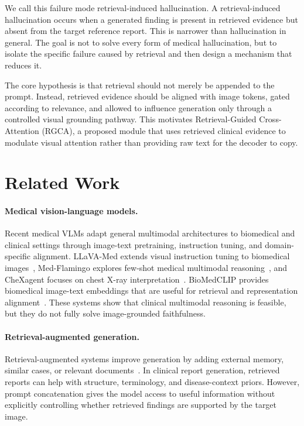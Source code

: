 \documentclass[11pt]{article}
\begin{document}
We call this failure mode retrieval-induced hallucination. A retrieval-induced hallucination occurs when a generated finding is present in retrieved evidence but absent from the target reference report. This is narrower than hallucination in general. The goal is not to solve every form of medical hallucination, but to isolate the specific failure caused by retrieval and then design a mechanism that reduces it.

The core hypothesis is that retrieval should not merely be appended to the prompt. Instead, retrieved evidence should be aligned with image tokens, gated according to relevance, and allowed to influence generation only through a controlled visual grounding pathway. This motivates Retrieval-Guided Cross-Attention (RGCA), a proposed module that uses retrieved clinical evidence to modulate visual attention rather than providing raw text for the decoder to copy.

\section{Related Work}

\paragraph{Medical vision-language models.}
Recent medical VLMs adapt general multimodal architectures to biomedical and clinical settings through image-text pretraining, instruction tuning, and domain-specific alignment. LLaVA-Med extends visual instruction tuning to biomedical images~\cite{li2023llavamed}, Med-Flamingo explores few-shot medical multimodal reasoning~\cite{moor2023medflamingo}, and CheXagent focuses on chest X-ray interpretation~\cite{chen2024chexagent}. BioMedCLIP provides biomedical image-text embeddings that are useful for retrieval and representation alignment~\cite{zhang2023biomedclip}. These systems show that clinical multimodal reasoning is feasible, but they do not fully solve image-grounded faithfulness.

\paragraph{Retrieval-augmented generation.}
Retrieval-augmented systems improve generation by adding external memory, similar cases, or relevant documents~\cite{borgeaud2022retro}. In clinical report generation, retrieved reports can help with structure, terminology, and disease-context priors. However, prompt concatenation gives the model access to useful information without explicitly controlling whether retrieved findings are supported by the target image.
\end{document}
